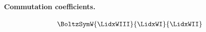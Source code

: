 \paragraph{Commutation coefficients.}
\begin{align}
 \BoltzSymW{\LidxWIII}{\LidxWI}{\LidxWII}

\end{align}
